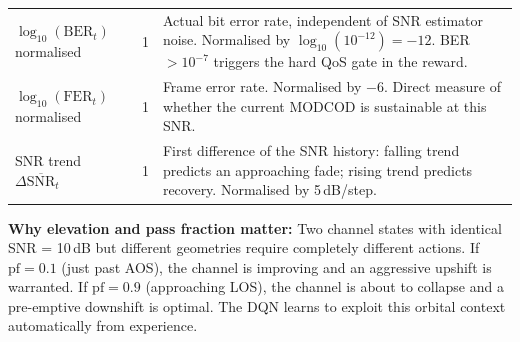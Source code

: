 \documentclass[12pt,a4paper]{report}
\begin{document}
\begin{table}[H]
\begin{tabular}{p{4.2cm}cp{7.3cm}}
$\log_{10}(\text{BER}_t)$ normalised
  & 1  & Actual bit error rate, independent of SNR estimator noise.
         Normalised by $\log_{10}(10^{-12}) = -12$.
         BER $> 10^{-7}$ triggers the hard QoS gate in the reward. \\[4pt]
$\log_{10}(\text{FER}_t)$ normalised
  & 1  & Frame error rate. Normalised by $-6$. Direct measure of
         whether the current MODCOD is sustainable at this SNR. \\[4pt]
SNR trend $\Delta\overline{\text{SNR}}_t$
  & 1  & First difference of the SNR history: falling trend predicts
         an approaching fade; rising trend predicts recovery. Normalised
         by 5\,dB/step. \\
\bottomrule
\end{tabular}
\end{table}

\noindent
\textbf{Why elevation and pass fraction matter:} Two channel states with
identical SNR = 10\,dB but different geometries require completely different
actions. If $\text{pf} = 0.1$ (just past AOS), the channel is improving and
an aggressive upshift is warranted. If $\text{pf} = 0.9$ (approaching LOS),
the channel is about to collapse and a pre-emptive downshift is optimal.
The DQN learns to exploit this orbital context automatically from experience.
\end{document}
